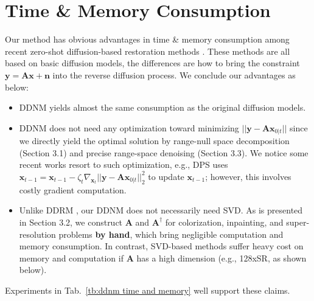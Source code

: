 \documentclass{article} \usepackage{iclr2023_conference,times}
\begin{document}
\section{Time \& Memory Consumption}
\label{ap: time and memory}
Our method has obvious advantages in time \& memory consumption among recent zero-shot diffusion-based restoration methods \citep{kawar2022denoising,ho2022video,chung2022improving,chung2022diffusion}. These methods are all based on basic diffusion models, the differences are how to bring the constraint $\mathbf{y}=\mathbf{Ax}+\mathbf{n}$ into the reverse diffusion process. We conclude our advantages as below:
\begin{itemize}
\item DDNM yields almost the same consumption as the original diffusion models.
\item DDNM does not need any optimization toward minimizing $||\mathbf{y}-\mathbf{A}\mathbf{x}_{0|t}||$ since we directly yield the optimal solution by range-null space decomposition (Section 3.1) and precise range-space denoising (Section 3.3). We notice some recent works \citep{ho2022video,chung2022improving,chung2022diffusion} resort to such optimization, e.g., DPS \citep{chung2022diffusion} uses $\mathbf{x}_{t-1} = \mathbf{x}_{t-1} - \zeta_t\nabla_{\mathbf{x}_{t}}||\mathbf{y}-\mathbf{A}\mathbf{x}_{0|t}||^2_2$ to update $\mathbf{x}_{t-1}$; however, this involves costly gradient computation. 
\item Unlike DDRM \citep{kawar2022denoising}, our DDNM does not necessarily need SVD. As is presented in Section 3.2, we construct $\mathbf{A}$ and $\mathbf{A}^{\dagger}$ for colorization, inpainting, and super-resolution problems \textbf{by hand}, which bring negligible computation and memory consumption. In contrast, SVD-based methods suffer heavy cost on memory and computation if $\mathbf{A}$ has a high dimension (e.g., 128xSR, as shown below). 
\end{itemize}

Experiments in Tab.~\ref{tb:ddnm time and memory} well support these claims.
\end{document}
